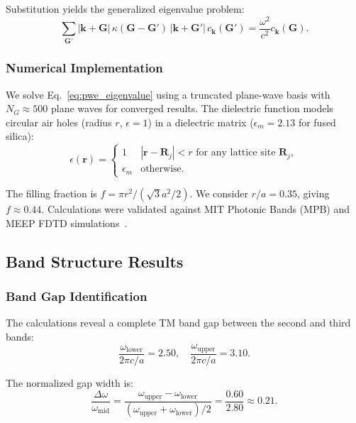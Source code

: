Substitution yields the generalized eigenvalue problem:
\begin{equation}
\sum_{\mathbf{G}'} |\mathbf{k} + \mathbf{G}| \, \kappa(\mathbf{G} - \mathbf{G}') \, |\mathbf{k} + \mathbf{G}'| \, c_{\mathbf{k}}(\mathbf{G}') = \frac{\omega^2}{c^2} c_{\mathbf{k}}(\mathbf{G}).
\label{eq:pwe_eigenvalue}
\end{equation}

\subsubsection{Numerical Implementation}

We solve Eq.~\eqref{eq:pwe_eigenvalue} using a truncated plane-wave basis with $N_G \approx 500$ plane waves for converged results. The dielectric function models circular air holes (radius $r$, $\epsilon = 1$) in a dielectric matrix ($\epsilon_m = 2.13$ for fused silica):
\begin{equation}
\epsilon(\mathbf{r}) = \begin{cases}
1 & |\mathbf{r} - \mathbf{R}_j| < r \text{ for any lattice site } \mathbf{R}_j, \\
\epsilon_m & \text{otherwise}.
\end{cases}
\end{equation}

The filling fraction is $f = \pi r^2 / (\sqrt{3} a^2 / 2)$. We consider $r/a = 0.35$, giving $f \approx 0.44$. Calculations were validated against MIT Photonic Bands (MPB) and MEEP FDTD simulations~\cite{MEEP}.

\subsection{Band Structure Results}

\subsubsection{Band Gap Identification}

The calculations reveal a complete TM band gap between the second and third bands:
\begin{equation}
\frac{\omega_{\mathrm{lower}}}{2\pi c/a} = 2.50, \quad \frac{\omega_{\mathrm{upper}}}{2\pi c/a} = 3.10.
\end{equation}

The normalized gap width is:
\begin{equation}
\frac{\Delta\omega}{\omega_{\mathrm{mid}}} = \frac{\omega_{\mathrm{upper}} - \omega_{\mathrm{lower}}}{(\omega_{\mathrm{upper}} + \omega_{\mathrm{lower}})/2} = \frac{0.60}{2.80} \approx 0.21.
\label{eq:gap_width}
\end{equation}

